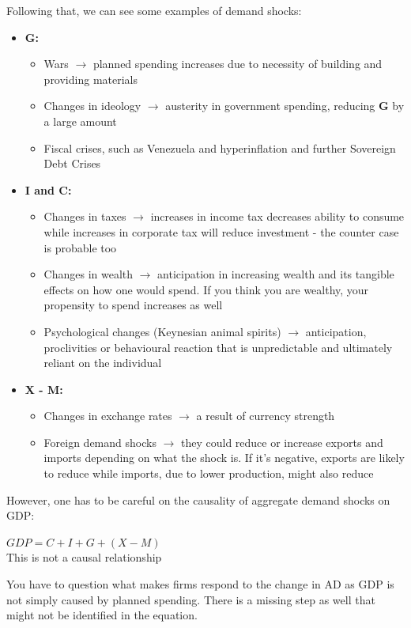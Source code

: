 \documentclass[12pt, letterpaper]{article}
\begin{document}
Following that, we can see some examples of demand shocks:
\begin{itemize}
	\item \textbf{G:}
		\begin{itemize}
			\item Wars $\rightarrow$ planned spending increases due to necessity of building and providing materials
			\item Changes in ideology $\rightarrow$ austerity in government spending, reducing \textbf{G} by a large amount
			\item Fiscal crises, such as Venezuela and hyperinflation and further  Sovereign Debt Crises
		\end{itemize}
	\item \textbf{I and C:}
		\begin{itemize}
			\item Changes in taxes $\rightarrow$ increases in income tax decreases ability to consume while increases in corporate tax will reduce investment - the counter case is probable too
			\item Changes in wealth $\rightarrow$ anticipation in increasing wealth and its tangible effects on how one would spend. If you think you are wealthy, your propensity to spend increases as well
			\item Psychological changes (Keynesian animal spirits) $\rightarrow$ anticipation, proclivities or behavioural reaction that is unpredictable and ultimately reliant on the individual
		\end{itemize}
	\item \textbf{X - M:}
		\begin{itemize}
			\item Changes in exchange rates $\rightarrow$ a result of currency strength
			\item Foreign demand shocks $\rightarrow$ they could reduce or increase exports and imports depending on what the shock is. If it's negative, exports are likely to reduce while imports, due to lower production, might also reduce
		\end{itemize}
\end{itemize}

However, one has to be careful on the causality of aggregate demand shocks on GDP:
\begin{center}
	$GDP = C + I + G + (X-M)$ \\
	This is not a causal relationship
\end{center}
You have to question what makes firms respond to the change in AD as GDP is not simply caused by planned spending. There is a missing step as well that might not be identified in the equation.
\end{document}
